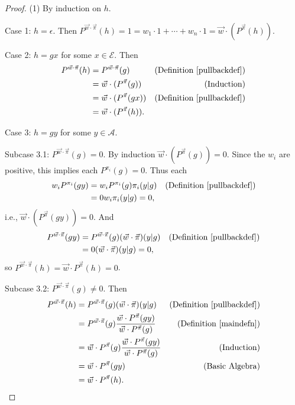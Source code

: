\documentclass[twoside]{article}
\begin{document}
\begin{proof}
    (1) By induction on $h$.

    Case 1: $h=\epsilon$. Then
    $P^{\vec w\cdot\vec\pi}(h)=1=w_1\cdot 1+\cdots+w_n\cdot 1
    =\vec w\cdot ({P^{\vec\pi}}(h))$.

    Case 2: $h=gx$ for some $x\in\mathcal E$. Then
    \begin{align*}
        P^{\vec w\cdot\vec\pi}(h)
            &= P^{\vec w\cdot\vec\pi}(g)
                &\mbox{(Definition \ref{pullbackdef})}\\
            &= \vec w\cdot({P^{\vec\pi}}(g))
                &\mbox{(Induction)}\\
            &= \vec w\cdot({P^{\vec\pi}}(gx))
                &\mbox{(Definition \ref{pullbackdef})}\\
            &= \vec w\cdot({P^{\vec\pi}}(h)).
    \end{align*}

    Case 3: $h=gy$ for some $y\in\mathcal A$.

    Subcase 3.1: $P^{\vec w\cdot\vec\pi}(g)=0$.
        By induction $\vec w\cdot({P^{\vec\pi}}(g))=0$.
        Since the $w_i$ are positive, this implies
        each $P^{\pi_i}(g)=0$.
        Thus each
        \begin{align*}
            w_i P^{\pi_i}(gy)
                &= w_i P^{\pi_i}(g)\pi_i(y|g)
                    &\mbox{(Definition \ref{pullbackdef})}\\
                &= 0w_i\pi_i(y|g)=0,
        \end{align*}
        i.e., $\vec w\cdot({P^{\vec\pi}}(gy))=0$.
        And
        \begin{align*}
            P^{\vec w\cdot\vec\pi}(gy)
                &= P^{\vec w\cdot\vec\pi}(g)(\vec w\cdot\vec\pi)(y|g)
                    &\mbox{(Definition \ref{pullbackdef})}\\
                &= 0(\vec w\cdot\vec\pi)(y|g) = 0,
        \end{align*}
        so $P^{\vec w\cdot\vec\pi}(h)=\vec w\cdot P^{\vec\pi}(h)=0$.

    Subcase 3.2: ${P^{\vec w\cdot\vec\pi}}(g)\not=0$. Then
    \begin{align*}
        P^{\vec w\cdot\vec\pi}(h)
            &= P^{\vec w\cdot\vec\pi}(g)(\vec w\cdot\vec\pi)(y|g)
                &\mbox{(Definition \ref{pullbackdef})}\\
            &= P^{\vec w\cdot\vec\pi}(g)
                \frac
                {\vec w\cdot {P^{\vec\pi}}(gy)}
                {\vec w\cdot {P^{\vec\pi}}(g)}
                &\mbox{(Definition \ref{maindefn})}\\
            &= \vec w\cdot {P^{\vec\pi}}(g)
                \frac
                {\vec w\cdot {P^{\vec\pi}}(gy)}
                {\vec w\cdot {P^{\vec\pi}}(g)}
                &\mbox{(Induction)}\\
            &= \vec w\cdot {P^{\vec\pi}}(gy)
                &\mbox{(Basic Algebra)}\\
            &= \vec w\cdot {P^{\vec\pi}}(h).
    \end{align*}


\end{proof}
\end{document}
